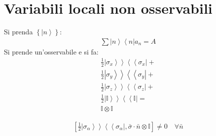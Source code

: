 \section{Variabili locali non osservabili} %
Si prenda $\left\{\left |n \right\rangle\right\}$:
\begin{equation}\begin{split}
\sum{\left |n \right\rangle\left\langle n\right |a_n}=A
\end{split}\end{equation}
Si prende un'osservabile e si fa:
\begin{equation}\begin{split}
\frac{1}{2}\left.\left |\sigma_{x} \right\rangle\right\rangle\left\langle\left\langle \sigma_{x} \right.\right |+\\
\frac{1}{2}\left.\left |\sigma_{y} \right\rangle\right\rangle\left\langle\left\langle \sigma_{y} \right.\right |+\\
\frac{1}{2}\left.\left |\sigma_{z} \right\rangle\right\rangle\left\langle\left\langle \sigma_{z} \right.\right |+\\
\frac{1}{2}\left.\left |\mathbb{I}\right\rangle\right\rangle\left\langle\left\langle \mathbb{I} \right.\right |=\\
\mathbb{I}\otimes\mathbb{I}
\end{split}\end{equation}

\begin{equation}\begin{split}
\left[\frac{1}{2}\left.\left |\sigma_{\alpha} \right\rangle\right\rangle\left\langle\left\langle \sigma_{\alpha } \right.\right |, \bar \sigma\cdot \bar n\otimes\mathbb{I}\right]\neq 0 \quad \forall \bar n
\end{split}\end{equation}